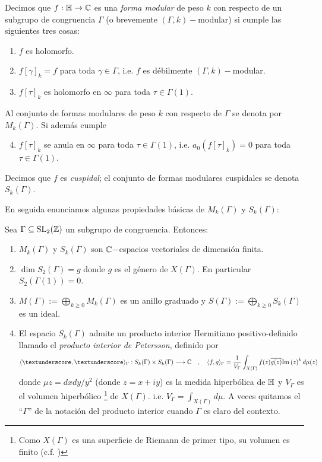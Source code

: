 \documentclass[../../tesis_maestria]{subfiles}
\begin{document}
\begin{defin}
  Decimos que $f:\mathbb{H}\rightarrow\mathbb{C}$ es una \emph{forma modular} de peso $k$ con respecto de un subgrupo de
  congruencia $\Gamma$ (o brevemente $(\Gamma,k)-$modular) si cumple las siguientes tres cosas:
  \begin{enumerate}[label=\emph{\roman*})]
  \item $f$ es holomorfo.
  \item $f[\gamma]_k=f$ para toda $\gamma\in\Gamma$, i.e. $f$ es d\'ebilmente $(\Gamma,k)-$modular.
  \item $f[\tau]_k$ es holomorfo en $\infty$ para toda $\tau\in\Gamma(1)$.
  \end{enumerate}
  Al conjunto de formas modulares de peso $k$ con respecto de $\Gamma$ se denota por $M_k(\Gamma)$.
  Si adem\'as cumple
  \begin{enumerate}[label=\emph{\roman*})]\setcounter{enumi}{3}
  \item $f[\tau]_k$ se anula en $\infty$ para toda $\tau\in\Gamma(1)$, i.e. $a_0(f[\tau]_k)=0$ para
    toda $\tau\in\Gamma(1)$.
  \end{enumerate}
  Decimos que $f$ es \emph{cuspidal}; el conjunto de formas modulares cuspidales se
  denota $S_k(\Gamma)$.
\end{defin}

En seguida enunciamos algunas propiedades b\'asicas de $M_k(\Gamma)$ y $S_k(\Gamma)$:

\begin{prop}\label{prop:prop_de_M}
 Sea $\Gamma\subseteq\mathrm{SL}_2(\mathbb{Z})$ un subgrupo de congruencia. Entonces:
  \begin{enumerate}[label=\roman*)]
  \item $M_k(\Gamma)$ y $S_k(\Gamma)$ son $\mathbb{C}-$espacios vectoriales de dimensi\'on finita.
  \item $\dim S_2(\Gamma)=g$ donde $g$ es el g\'enero de $X(\Gamma)$. En particular $S_2(\Gamma(1))=0$.
  \item\label{prop_de_M_3} $M(\Gamma):=\bigoplus_{k\geq0}M_k(\Gamma)$ es un anillo graduado y
    $S(\Gamma):=\bigoplus_{k\geq0}S_k(\Gamma)$ es un ideal.
  \item El espacio $S_k(\Gamma)$ admite un producto interior Hermitiano positivo-definido
    llamado el \emph{producto interior de Petersson}, definido por
    \[
      \gen{\textunderscore,\textunderscore}_{\Gamma}:S_k(\Gamma)\times S_k(\Gamma)\lra\CC\quad,\quad
      \gen{f,g}_{\Gamma}=\frac{1}{V_{\Gamma}}\int_{X(\Gamma)}f(z)\ol{g(z)}\im{z}^kd\mu(z)
    \]
    donde $\mu z=dxdy/y^2$ (donde $z=x+iy$) es la medida hiperb\'olica de $\mathbb{H}$ y $V_{\Gamma}$ es
    el volumen hiperb\'olico%
    \footnote{Como $X(\Gamma)$ es una superficie de Riemann de primer tipo, su
      volumen es finito (c.f. \cite{FarkasKra})} de $X(\Gamma)$. i.e.
    $V_{\Gamma}=\int_{X(\Gamma)}d\mu$. A veces quitamos el ``$\Gamma$'' de la notaci\'on del producto
    interior cuando $\Gamma$ es claro del contexto.
  \end{enumerate}
\end{prop}
\end{document}
